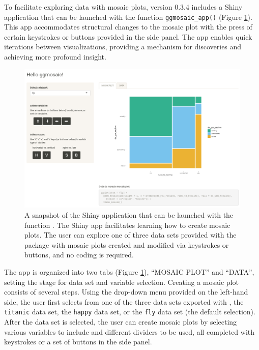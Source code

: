 To facilitate exploring data with mosaic plots,  version 0.3.4 includes a Shiny application that can be launched with the function \texttt{ggmosaic\_app()} (Figure \ref{fig:app}). This app accommodates structural changes to the mosaic plot with the press of certain keystrokes or buttons provided in the side panel. The app enables quick iterations between visualizations, providing a mechanism for discoveries and achieving more profound insight.

\begin{figure}

{\centering \includegraphics[width=1\linewidth]{app} 

}

\caption{A snapshot of the Shiny application that can be launched with the function . The Shiny app facilitates learning how to create mosaic plots. The user can explore one of three data sets provided with the package with mosaic plots created and modified via keystrokes or buttons, and no coding is required.}\label{fig:app}
\end{figure}

The app is organized into two tabs (Figure \ref{fig:app}), ``MOSAIC PLOT'' and ``DATA'', setting the stage for data set and variable selection. Creating a mosaic plot consists of several steps. Using the drop-down menu provided on the left-hand side, the user first selects from one of the three data sets exported with , the \texttt{titanic} data set, the \texttt{happy} data set, or the \texttt{fly} data set (the default selection). After the data set is selected, the user can create mosaic plots by selecting various variables to include and different dividers to be used, all completed with keystrokes or a set of buttons in the side panel.

